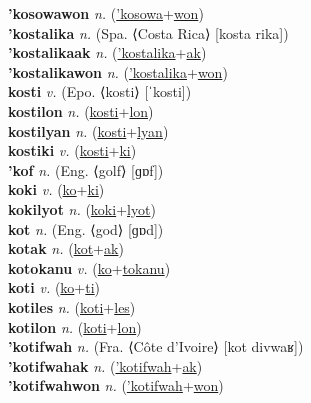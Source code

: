 \textbf{'kosowawon} \textit{n.} (\hyperref['kosowa]{'kosowa}+\hyperref[won]{won})
 \label{'kosowawon} \\
\textbf{'kostalika} \textit{n.} (Spa. ⟨Costa Rica⟩ [kosta rika])
 \label{'kostalika} \\
\textbf{'kostalikaak} \textit{n.} (\hyperref['kostalika]{'kostalika}+\hyperref[ak]{ak})
 \label{'kostalikaak} \\
\textbf{'kostalikawon} \textit{n.} (\hyperref['kostalika]{'kostalika}+\hyperref[won]{won})
 \label{'kostalikawon} \\
\textbf{kosti} \textit{v.} (Epo. ⟨kosti⟩ [ˈkosti])
 \label{kosti} \\
\textbf{kostilon} \textit{n.} (\hyperref[kosti]{kosti}+\hyperref[lon]{lon})
 \label{kostilon} \\
\textbf{kostilyan} \textit{n.} (\hyperref[kosti]{kosti}+\hyperref[lyan]{lyan})
 \label{kostilyan} \\
\textbf{kostiki} \textit{v.} (\hyperref[kosti]{kosti}+\hyperref[ki]{ki})
 \label{kostiki} \\
\textbf{'kof} \textit{n.} (Eng. ⟨golf⟩ [ɡɒf])
 \label{'kof} \\
\textbf{koki} \textit{v.} (\hyperref[ko]{ko}+\hyperref[ki]{ki})
 \label{koki} \\
\textbf{kokilyot} \textit{n.} (\hyperref[koki]{koki}+\hyperref[lyot]{lyot})
 \label{kokilyot} \\
\textbf{kot} \textit{n.} (Eng. ⟨god⟩ [ɡɒd])
 \label{kot} \\
\textbf{kotak} \textit{n.} (\hyperref[kot]{kot}+\hyperref[ak]{ak})
 \label{kotak} \\
\textbf{kotokanu} \textit{v.} (\hyperref[ko]{ko}+\hyperref[tokanu]{tokanu})
 \label{kotokanu} \\
\textbf{koti} \textit{v.} (\hyperref[ko]{ko}+\hyperref[ti]{ti})
 \label{koti} \\
\textbf{kotiles} \textit{n.} (\hyperref[koti]{koti}+\hyperref[les]{les})
 \label{kotiles} \\
\textbf{kotilon} \textit{n.} (\hyperref[koti]{koti}+\hyperref[lon]{lon})
 \label{kotilon} \\
\textbf{'kotifwah} \textit{n.} (Fra. ⟨Côte d’Ivoire⟩ [kot divwaʁ])
 \label{'kotifwah} \\
\textbf{'kotifwahak} \textit{n.} (\hyperref['kotifwah]{'kotifwah}+\hyperref[ak]{ak})
 \label{'kotifwahak} \\
\textbf{'kotifwahwon} \textit{n.} (\hyperref['kotifwah]{'kotifwah}+\hyperref[won]{won})
 \label{'kotifwahwon} \\
